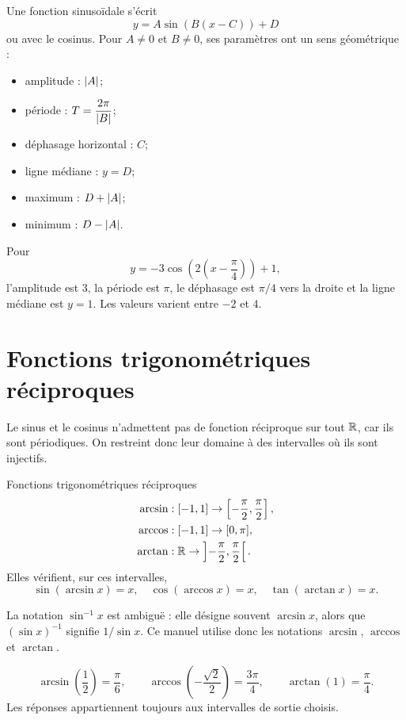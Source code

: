 Une fonction sinusoïdale s'écrit
\[
y=A\sin(B(x-C))+D
\]
ou avec le cosinus. Pour \(A\ne0\) et \(B\ne0\), ses paramètres ont un sens géométrique :
\begin{itemize}
\item amplitude : $\left\lvert A\right\rvert$;
\item période : $T=\dfrac{2\pi}{\left\lvert B\right\rvert}$;
\item déphasage horizontal : $C$;
\item ligne médiane : $y=D$;
\item maximum : $D+\left\lvert A\right\rvert$;
\item minimum : $D-\left\lvert A\right\rvert$.
\end{itemize}

\begin{examplebox}
Pour
\[
y=-3\cos\left(2\left(x-\frac\pi4\right)\right)+1,
\]
l'amplitude est $3$, la période est $\pi$, le déphasage est $\pi/4$ vers la droite et la ligne médiane est $y=1$. Les valeurs varient entre $-2$ et $4$.
\end{examplebox}

\section{Fonctions trigonométriques réciproques}
\label{manual:section:16.03}

Le sinus et le cosinus n'admettent pas de fonction réciproque sur tout $\mathbb{R}$, car ils sont périodiques. On restreint donc leur domaine à des intervalles où ils sont injectifs.

\begin{definition}{Fonctions trigonométriques réciproques}{}
\begin{align*}
\arcsin&:[-1,1]\to\left[-\frac\pi2,\frac\pi2\right],\\
\arccos&:[-1,1]\to[0,\pi],\\
\arctan&:\mathbb{R}\to\left]-\frac\pi2,\frac\pi2\right[.
\end{align*}
Elles vérifient, sur ces intervalles,
\[
\sin(\arcsin x)=x,
\quad
\cos(\arccos x)=x,
\quad
\tan(\arctan x)=x.
\]
\end{definition}

\begin{warningbox}
La notation $\sin^{-1}x$ est ambiguë : elle désigne souvent $\arcsin x$, alors que $(\sin x)^{-1}$ signifie $1/\sin x$. Ce manuel utilise donc les notations $\arcsin$, $\arccos$ et $\arctan$.
\end{warningbox}

\begin{examplebox}
\[
\arcsin\left(\frac12\right)=\frac\pi6,
\qquad
\arccos\left(-\frac{\sqrt2}{2}\right)=\frac{3\pi}{4},
\qquad
\arctan(1)=\frac\pi4.
\]
Les réponses appartiennent toujours aux intervalles de sortie choisis.
\end{examplebox}

